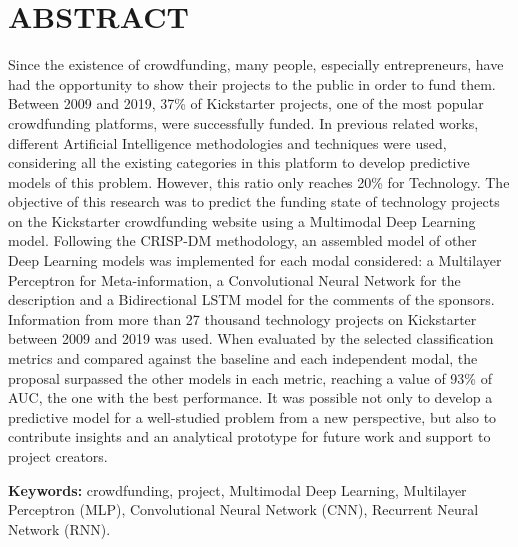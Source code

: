 \chapter*{ABSTRACT}
Since the existence of crowdfunding, many people, especially entrepreneurs, have had the opportunity to show their projects to the public in order to fund them. Between 2009 and 2019, 37\% of Kickstarter projects, one of the most popular crowdfunding platforms, were successfully funded. In previous related works, different Artificial Intelligence methodologies and techniques were used, considering all the existing categories in this platform to develop predictive models of this problem. However, this ratio only reaches 20\% for Technology. The objective of this research was to predict the funding state of technology projects on the Kickstarter crowdfunding website using a Multimodal Deep Learning model. Following the CRISP-DM methodology, an assembled model of other Deep Learning models was implemented for each modal considered: a Multilayer Perceptron for Meta-information, a Convolutional Neural Network for the description and a Bidirectional LSTM model for the comments of the sponsors. Information from more than 27 thousand technology projects on Kickstarter between 2009 and 2019 was used. When evaluated by the selected classification metrics and compared against the baseline and each independent modal, the proposal surpassed the other models in each metric, reaching a value of 93\% of AUC, the one with the best performance. It was possible not only to develop a predictive model for a well-studied problem from a new perspective, but also to contribute insights and an analytical prototype for future work and support to project creators.

\textbf{Keywords: } crowdfunding, project, Multimodal Deep Learning, Multilayer Perceptron (MLP), Convolutional Neural Network (CNN), Recurrent Neural Network (RNN).